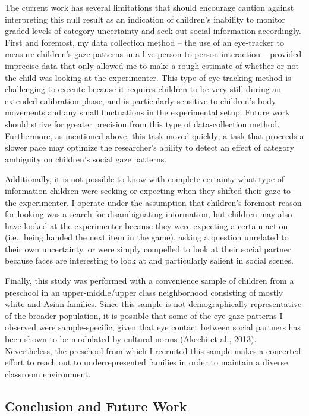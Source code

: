 \documentclass[floatsintext,man]{apa6}
\theoremstyle{definition}
\theoremstyle{definition}
\theoremstyle{definition}
\theoremstyle{remark}
\begin{document}
The current work has several limitations that should encourage caution
against interpreting this null result as an indication of children's
inability to monitor graded levels of category uncertainty and seek out
social information accordingly. First and foremost, my data collection
method -- the use of an eye-tracker to measure children's gaze patterns
in a live person-to-person interaction -- provided imprecise data that
only allowed me to make a rough estimate of whether or not the child was
looking at the experimenter. This type of eye-tracking method is
challenging to execute because it requires children to be very still
during an extended calibration phase, and is particularly sensitive to
children's body movements and any small fluctuations in the experimental
setup. Future work should strive for greater precision from this type of
data-collection method. Furthermore, as mentioned above, this task moved
quickly; a task that proceeds a slower pace may optimize the
researcher's ability to detect an effect of category ambiguity on
children's social gaze patterns.

Additionally, it is not possible to know with complete certainty what
type of information children were seeking or expecting when they shifted
their gaze to the experimenter. I operate under the assumption that
children's foremost reason for looking was a search for disambiguating
information, but children may also have looked at the experimenter
because they were expecting a certain action (i.e., being handed the
next item in the game), asking a question unrelated to their own
uncertainty, or were simply compelled to look at their social partner
because faces are interesting to look at and particularly salient in
social scenes.

Finally, this study was performed with a convenience sample of children
from a preschool in an upper-middle/upper class neighborhood consisting
of mostly white and Asian families. Since this sample is not
demographically representative of the broader population, it is possible
that some of the eye-gaze patterns I observed were sample-specific,
given that eye contact between social partners has been shown to be
modulated by cultural norms (Akechi et al., 2013). Nevertheless, the
preschool from which I recruited this sample makes a concerted effort to
reach out to underrepresented families in order to maintain a diverse
classroom environment.

\subsection{Conclusion and Future
Work}\label{conclusion-and-future-work}
\end{document}

